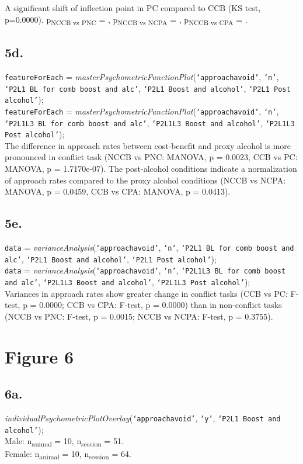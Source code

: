 \documentclass{article}
\begin{document}
A significant shift of inflection point in PC compared to CCB (KS test, p=0.0000). p\textsubscript{NCCB vs PNC} = , p\textsubscript{NCCB vs NCPA} = , p\textsubscript{NCCB vs CPA} = .

\subsection{5d.}
\texttt{featureForEach} = \emph{masterPsychometricFunctionPlot}(\texttt{`approachavoid'}, \texttt{`n'}, \texttt{`P2L1 BL for comb boost and alc'}, \texttt{`P2L1 Boost and alcohol'}, \texttt{`P2L1 Post alcohol'});\\
\texttt{featureForEach} = \emph{masterPsychometricFunctionPlot}(\texttt{`approachavoid'}, \texttt{`n'}, \texttt{`P2L1L3 BL for comb boost and alc'}, \texttt{`P2L1L3 Boost and alcohol'}, \texttt{`P2L1L3 Post alcohol'});\\

The difference in approach rates between cost-benefit and proxy alcohol is more pronounced in conflict task (NCCB vs PNC: MANOVA, p = 0.0023, CCB vs PC: MANOVA, p = 1.7170e-07). The post-alcohol conditions indicate a normalization of approach rates compared to the proxy alcohol conditions (NCCB vs NCPA: MANOVA, p = 0.0459, CCB vs CPA: MANOVA, p = 0.0413).

\subsection{5e.}
\texttt{data} = \emph{varianceAnalysis}(\texttt{`approachavoid'}, \texttt{`n'}, \texttt{`P2L1 BL for comb boost and alc'}, \texttt{`P2L1 Boost and alcohol'}, \texttt{`P2L1 Post alcohol'});\\
\texttt{data} = \emph{varianceAnalysis}(\texttt{`approachavoid'}, \texttt{`n'}, \texttt{`P2L1L3 BL for comb boost and alc'}, \texttt{`P2L1L3 Boost and alcohol'}, \texttt{`P2L1L3 Post alcohol'});\\

Variances in approach rates show greater change in conflict tasks (CCB vs PC: F-test, p = 0.0000; CCB vs CPA: F-test, p = 0.0000) than in non-conflict tasks (NCCB vs PNC: F-test, p = 0.0015; NCCB vs NCPA: F-test, p = 0.3755).


\section{Figure 6}
\subsection{6a.}
\emph{individualPsychometricPlotOverlay}(\texttt{`approachavoid'}, \texttt{`y'}, \texttt{`P2L1 Boost and alcohol'});\\
Male: n\textsubscript{animal} = 10, n\textsubscript{session} = 51.\\
Female: n\textsubscript{animal} = 10, n\textsubscript{session} = 64.\\
\end{document}

